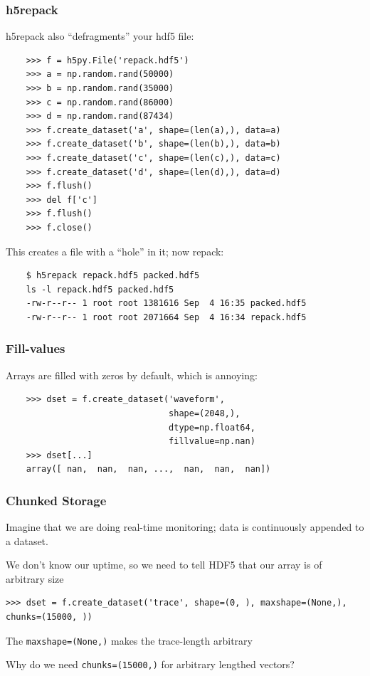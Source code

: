 \documentclass[9pt]{beamer}
\begin{document}
\begin{frame}[fragile]
  \frametitle{h5repack}
  h5repack also ``defragments'' your hdf5 file:
  \begin{verbatim}
    >>> f = h5py.File('repack.hdf5')
    >>> a = np.random.rand(50000)
    >>> b = np.random.rand(35000)
    >>> c = np.random.rand(86000)
    >>> d = np.random.rand(87434)
    >>> f.create_dataset('a', shape=(len(a),), data=a)
    >>> f.create_dataset('b', shape=(len(b),), data=b)
    >>> f.create_dataset('c', shape=(len(c),), data=c)
    >>> f.create_dataset('d', shape=(len(d),), data=d)
    >>> f.flush()
    >>> del f['c']
    >>> f.flush()
    >>> f.close()
  \end{verbatim}
  This creates a file with a ``hole'' in it; now repack:
  \begin{verbatim}
    $ h5repack repack.hdf5 packed.hdf5
    ls -l repack.hdf5 packed.hdf5
    -rw-r--r-- 1 root root 1381616 Sep  4 16:35 packed.hdf5
    -rw-r--r-- 1 root root 2071664 Sep  4 16:34 repack.hdf5
  \end{verbatim}
  
\end{frame}


\begin{frame}[fragile]
  \frametitle{Fill-values}
  Arrays are filled with zeros by default, which is annoying:
  \begin{verbatim}
    >>> dset = f.create_dataset('waveform',
                                shape=(2048,),
                                dtype=np.float64,
                                fillvalue=np.nan)
    >>> dset[...]
    array([ nan,  nan,  nan, ...,  nan,  nan,  nan])
  \end{verbatim}
\end{frame}

\begin{frame}[fragile]
\frametitle{Chunked Storage}
Imagine that we are doing real-time monitoring; data is continuously appended to a dataset.

We don't know our uptime, so we need to tell HDF5 that our array is of arbitrary size
\begin{verbatim}
>>> dset = f.create_dataset('trace', shape=(0, ), maxshape=(None,), chunks=(15000, ))
\end{verbatim}
The \texttt{maxshape=(None,)} makes the trace-length arbitrary

Why do we need \texttt{chunks=(15000,)} for arbitrary lengthed vectors?
\end{frame}
\end{document}
